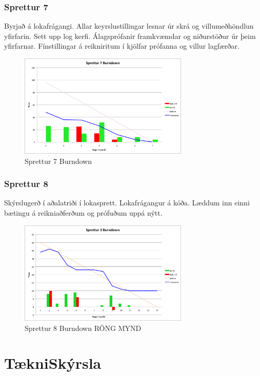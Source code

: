 \documentclass{article}
\begin{document}
\subsubsection{Sprettur 7}
Byrjað á lokafrágangi. Allar keyrslustillingar lesnar úr skrá og villumeðhöndlun yfirfarin. Sett upp log kerfi. Álagsprófanir framkvæmdar og 
niðurstöður úr þeim yfirfarnar. Fínstillingar á reikniritum í kjölfar prófanna og villur lagfærðar. 

\begin{figure}[H]
 \centering
 \includegraphics[width=0.72\textwidth]{Sprettur7_Burndown.png}
 \caption{Sprettur 7 Burndown}
\end{figure}

\subsubsection{Sprettur 8}
Skýrslugerð í aðalatriði í lokasprett. Lokafrágangur á kóða. Læddum inn einni bætingu á reikniaðferðum og prófuðum uppá nýtt.
\begin{figure}[H]
 \centering
 \includegraphics[width=0.72\textwidth]{Sprettur3_Burndown.png}
 \caption{Sprettur 8 Burndown RÖNG MYND}
\end{figure}


\newpage


\section{TækniSkýrsla}
\end{document}
